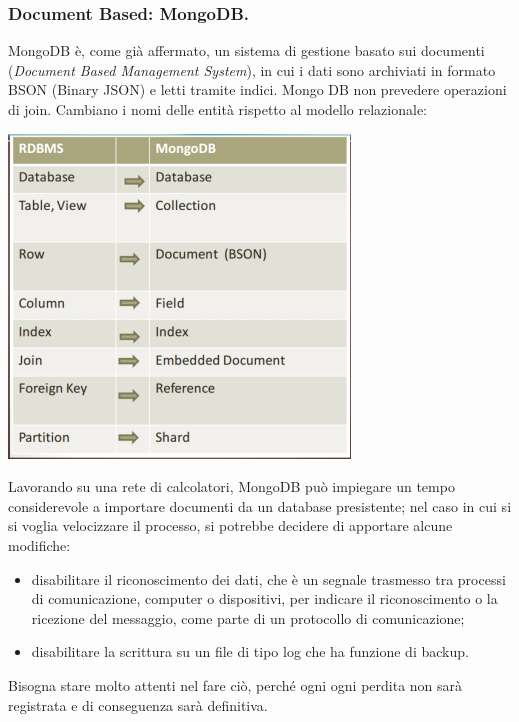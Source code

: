 \documentclass[a4page, 11pt]{article}
\begin{document}
\subsubsection{Document Based: MongoDB\cite{MongoDB, ScalingMongoDB}.}
MongoDB è, come già affermato, un sistema di gestione basato sui documenti (\textit{Document Based Management System}), in cui i dati sono archiviati in formato BSON (Binary JSON) e letti tramite indici. Mongo DB non prevedere operazioni di join. Cambiano i nomi delle entità rispetto al modello relazionale:
\begin{center}
  \includegraphics[scale=0.6]{IMAGE2.jpg}
\end{center}

Lavorando su una rete di calcolatori, MongoDB può impiegare un tempo considerevole a importare documenti da un database presistente; nel caso in cui si si voglia velocizzare il processo, si potrebbe decidere di apportare alcune modifiche:
\begin{itemize}[noitemsep]
\item disabilitare il riconoscimento dei dati, che è un segnale trasmesso tra processi di comunicazione, computer o dispositivi, per indicare il riconoscimento o la ricezione del messaggio, come parte di un protocollo di comunicazione;
\item disabilitare la scrittura su un file di tipo log che ha funzione di backup.
\end{itemize}
Bisogna stare molto attenti nel fare ciò, perché ogni ogni perdita non sarà registrata e di conseguenza sarà definitiva.
\newline
\end{document}

